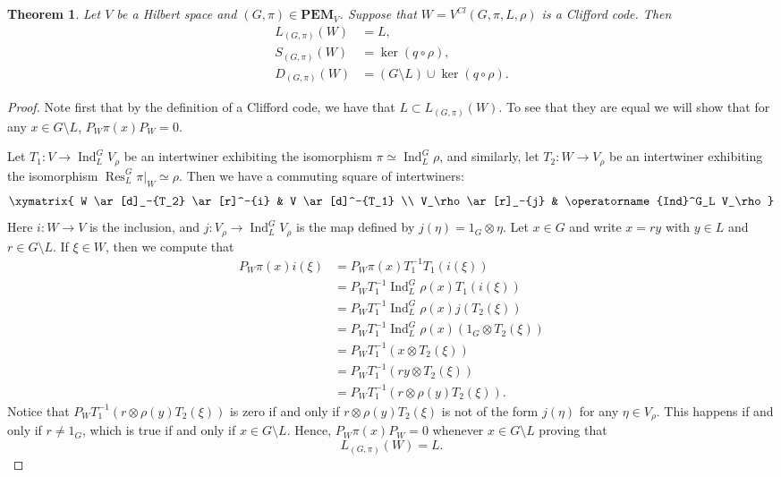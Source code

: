 \documentclass[11pt, oneside, reqno]{amsart}
\newcommand{\PEM}{\mathbf{PEM}}
\newcommand{\Res}{\operatorname{Res}}
\newcommand{\Ind}{\operatorname{Ind}}
\theoremstyle{definition}
\theoremstyle{plain}
\newtheorem{theorem}[definition]{Theorem}
\theoremstyle{remark}
\begin{document}
\begin{theorem}\label{thm:detectable errors:Clifford code}
    Let $V$ be a Hilbert space and $(G,\pi) \in \PEM_V$. Suppose that $W = V^{Cl}(G,\pi,L,\rho)$ is a Clifford code. Then
    \begin{align*}
        L_{(G,\pi)}(W) & = L, \\
        S_{(G,\pi)}(W) & = \ker(q \circ \rho), \\
        D_{(G,\pi)}(W) & = (G \setminus L) \cup \ker(q \circ \rho).
    \end{align*}
\end{theorem}
\begin{proof}
    Note first that by the definition of a Clifford code, we have that $L \subset L_{(G,\pi)}(W)$. To see that they are equal we will show that for any $x \in G \setminus L$, $P_W \pi(x) P_W = 0$.

    Let $T_1 \colon V \to \Ind^G_L V_\rho$ be an intertwiner exhibiting the isomorphism $\pi \simeq \Ind^G_L\rho$, and similarly, let $T_2 \colon W \to V_\rho$ be an intertwiner exhibiting the isomorphism $\Res^G_L\pi|_W \simeq \rho$. Then we have a commuting square of intertwiners:
    \begin{equation*}
        \xymatrix{
            W \ar[d]_-{T_2} \ar[r]^-{i} & V \ar[d]^-{T_1} \\
            V_\rho \ar[r]_-{j} & \Ind^G_L V_\rho
        }
    \end{equation*}
    Here $i \colon W \to V$ is the inclusion, and $j \colon V_\rho \to \Ind^G_L V_\rho$ is the map defined by $j(\eta) = 1_G \otimes \eta$. Let $x \in G$ and write $x = ry$ with $y \in L$ and $r \in G \setminus L$. If $\xi \in W$, then we compute that
    \begin{align*}
        P_W \pi(x) i(\xi)
        & = P_W \pi(x) T_1^{-1} T_1(i(\xi)) \\
        & = P_W T_1^{-1} \Ind^G_L\rho(x) T_1(i(\xi)) \\
        & = P_W T_1^{-1} \Ind^G_L\rho(x) j(T_2(\xi)) \\
        & = P_W T_1^{-1} \Ind^G_L\rho(x) (1_G \otimes T_2(\xi)) \\
        & = P_W T_1^{-1} (x \otimes T_2(\xi)) \\
        & = P_W T_1^{-1} (ry \otimes T_2(\xi)) \\
        & = P_W T_1^{-1} (r \otimes \rho(y)T_2(\xi)).
    \end{align*}
    Notice that $P_W T_1^{-1} (r \otimes \rho(y)T_2(\xi))$ is zero if and only if $r \otimes \rho(y)T_2(\xi)$ is not of the form $j(\eta)$ for any $\eta \in V_\rho$. This happens if and only if $r \neq 1_G$, which is true if and only if $x \in G \setminus L$. Hence, $P_W \pi(x) P_W = 0$ whenever $x \in G \setminus L$ proving that
    \begin{equation*}
        L_{(G,\pi)}(W) = L.
    \end{equation*}


\end{proof}
\end{document}
